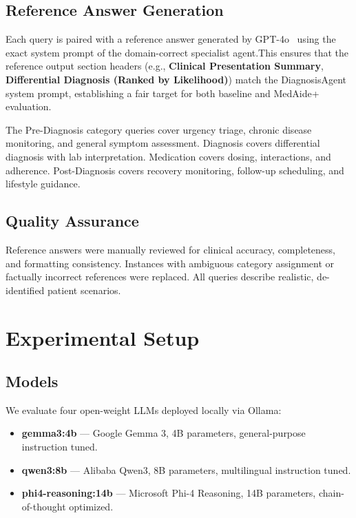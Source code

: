\documentclass[conference]{IEEEtran}
\begin{document}
\subsection{Reference Answer Generation}

Each query is paired with a reference answer generated by GPT-4o~\cite{openai2023gpt4}
using the exact system prompt of the domain-correct specialist agent.This ensures that
the reference output section headers (e.g., \textbf{Clinical Presentation Summary},
\textbf{Differential Diagnosis (Ranked by Likelihood)}) match the DiagnosisAgent
system prompt, establishing a fair target for both baseline and MedAide+ evaluation.

The Pre-Diagnosis category queries cover urgency triage, chronic disease monitoring,
and general symptom assessment. Diagnosis covers differential diagnosis with lab
interpretation. Medication covers dosing, interactions, and adherence. Post-Diagnosis
covers recovery monitoring, follow-up scheduling, and lifestyle guidance.

\subsection{Quality Assurance}

Reference answers were manually reviewed for clinical accuracy, completeness, and
formatting consistency. Instances with ambiguous category assignment or factually
incorrect references were replaced. All queries describe realistic, de-identified
patient scenarios.

\section{Experimental Setup}
\label{sec:setup}

\subsection{Models}

We evaluate four open-weight LLMs deployed locally via Ollama:
\begin{itemize}
  \item \textbf{gemma3:4b} — Google Gemma 3, 4B parameters, general-purpose instruction tuned.
  \item \textbf{qwen3:8b} — Alibaba Qwen3, 8B parameters, multilingual instruction tuned.
  \item \textbf{phi4-reasoning:14b} — Microsoft Phi-4 Reasoning, 14B parameters, chain-of-thought optimized.
\end{itemize}
\end{document}
